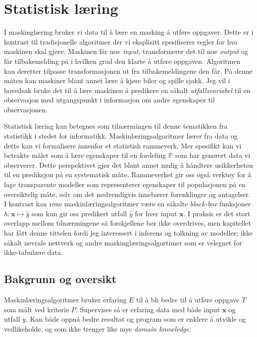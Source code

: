 \chapter{Statistisk læring}
I maskinglæring bruker vi data til å lære en masking å utføre oppgaver. Dette er i kontrast til tradisjonelle algoritmer der vi eksplisitt spesifiserer regler for hva maskinen skal gjøre. Maskinen får noe \textit{input}, transformerer det til noe \textit{output} og får tilbakemelding på i hvilken grad den klarte å utføre oppgaven. Algoritmen kan deretter tilpasse transformasjonen ut fra tilbakemeldingene den får. På denne måten kan maskiner blant annet lære å kjøre biler og spille sjakk. Jeg vil i hovedsak bruke det til å lære maskinen å predikere en såkalt \textit{utfallsvariabel} til en observasjon med utgangspunkt i informasjon om andre egenskaper til observasjonen. 

Statistisk læring kan betegnes som tilnærmingen til denne tematikken fra statistikk i stedet for informatikk. Maskinlæringsalgoritmer lærer fra data og dette kan vi formalisere innenfor et statistisk rammeverk. Mer spesifikt kan vi betrakte målet som å lære egenskaper til en fordeling $\mathbb{P}$ som har generert data vi observerer. Dette perspektivet gjør det blant annet mulig å håndtere usikkerheten til en prediksjon på en systematisk måte. Rammeverket gir oss også verktøy for å lage transparente modeller som representerer egenskaper til populasjonen på en oversiktelig måte, selv om det nødvendigvis innebærer forenklinger og antagelser. I kontrast kan rene maskinlæringsalgoritmer være en såkalte \textit{black-box} funksjoner $h:\mathbf{x}\mapsto \hat{y}$ som kun gir oss predikert utfall $\hat{y}$ for hver input $\mathbf{x}$. I praksis er det stort overlapp mellom tilnærmingene så forskjellene bør ikke overdrives, men kapitellet har fått denne tittelen fordi jeg interessert i inferens og tolkning av modeller; ikke såkalt nevrale nettverk og andre maskinglæringsalgortimer som er velegnet for ikke-tabulære data.
\section{Bakgrunn og oversikt}
Maskinlæringsalgoritmer bruker erfaring $E$ til å bli bedre til å utføre oppgave $T$ som målt ved kriterie $P$. Supervises så er erfaring data med både input $\mathbf{x}$ og utfall $y$. Kan både oppnå bedre resultat og program som er enklere å utvikle og vedlikeholde, og som ikke trenger like mye \textit{domain knowledge}.

